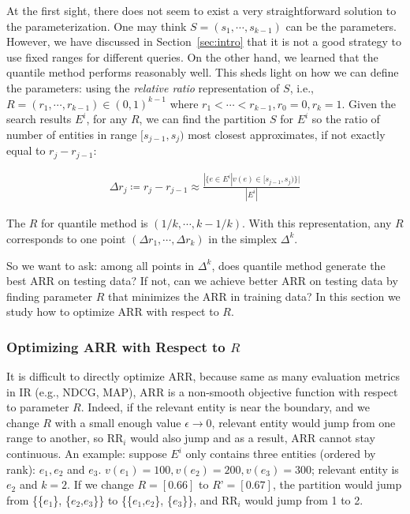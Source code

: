 At the first sight, there does not seem to exist a very straightforward solution to the parameterization. One may think $S=(s_1, \cdots, s_{k-1})$ can be the parameters. However, we have discussed in Section~\ref{sec:intro} that it is not a good strategy to use fixed ranges for different queries. On the other hand, we learned that the quantile method performs reasonably well. This sheds light on how we can define the parameters: using the \emph{relative ratio} representation of $S$, i.e., $R=(r_1, \cdots, r_{k-1})\in (0, 1)^{k-1}$ where $r_1 < \cdots < r_{k-1}, r_0=0, r_k = 1$. Given the search results $E^i$, for any $R$, we can find the partition $S$ for $E^i$ so the ratio of number of entities in range $[s_{j-1}, s_j)$ most closest approximates, if not exactly equal to $r_j - r_{j-1}$:

\vspace{-0.2in}
\begin{eqnarray*}
\Delta r_j\coloneqq r _j - r_{j-1} \approx \frac{|\{e\in E^i| v(e)\in [s_{j-1}, s_j)\}|}{|E^i|}
\end{eqnarray*}

The $R$ for quantile method is $(1/k, \cdots, k-1/k)$. With this representation, any $R$ corresponds to one point $(\Delta r_1, \cdots, \allowbreak \Delta r_k)$ in the simplex $\Delta^k$. 

So we want to ask: among all points in $\Delta^k$, does quantile method generate the best ARR on testing data? If not, can we achieve better ARR on testing data by finding parameter $R$ that minimizes the ARR in training data? In this section we study how to optimize ARR with respect to $R$. 

\subsubsection{Optimizing ARR with Respect to $R$}
\label{sec:opt_r}
It is difficult to directly optimize ARR, because same as many evaluation metrics in IR (e.g., NDCG\cite{DBLP:conf/nips/ValizadeganJZM09}, MAP\cite{yue2007support}), ARR is a non-smooth objective function with respect to parameter $R$. Indeed, if the relevant entity is near the boundary, and we change $R$ with a small enough value $\epsilon \rightarrow 0$, relevant entity would jump from one range to another, so RR$_i$ would also jump and as a result, ARR cannot stay continuous. An example: suppose $E^i$ only contains three entities (ordered by rank): $e_1, e_2$ and $e_3$. $v(e_1)=100, v(e_2)=200, v(e_3)=300$; relevant entity is $e_2$ and $k=2$. If we change $R=[0.66]$ to $R’=[0.67]$, the partition would jump from \{\{$e_1$\}, \{$e_2$,$e_3$\}\} to \{\{$e_1$,$e_2$\}, \{$e_3$\}\}, and RR$_i$ would jump from 1 to 2. 

